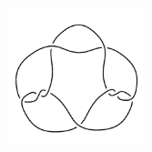 \documentclass[12pts]{report}
\begin{document}
\begin{enumerate}
\begin{center}
\includegraphics[width=0.3\textwidth] {diagrama2.png}
\end{center}
\end{enumerate}
\end{document}
